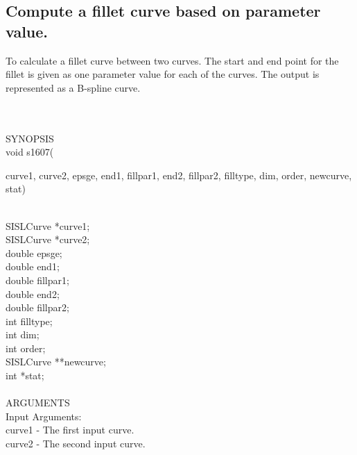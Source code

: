 \subsection{Compute a fillet curve based on parameter value.}
\begin{minipg1}
  To calculate a fillet curve between two curves. The start and end point
  for the fillet is given as one parameter value for each of the
  curves.
  The output is represented as a B-spline curve.
\end{minipg1} \\ \\
SYNOPSIS\\
        \>void s1607(\begin{minipg3}
        {\fov curve1}, {\fov curve2}, {\fov epsge}, {\fov end1}, {\fov fillpar1}, {\fov end2}, {\fov fillpar2},
        {\fov filltype}, {\fov dim}, {\fov order}, {\fov newcurve}, {\fov stat})
                \end{minipg3}\\[0.3ex]
                \>\>    SISLCurve       \>      *{\fov curve1};\\
                \>\>    SISLCurve       \>      *{\fov curve2};\\
                \>\>    double  \>      {\fov epsge};\\
                \>\>    double  \>      {\fov end1};\\
                \>\>    double  \>      {\fov fillpar1};\\
                \>\>    double  \>      {\fov end2};\\
                \>\>    double  \>      {\fov fillpar2};\\
                \>\>    int     \>      {\fov filltype};\\
                \>\>    int     \>      {\fov dim};\\
                \>\>    int     \>      {\fov order};\\
                \>\>    SISLCurve       \>      **{\fov newcurve};\\
                \>\>    int     \>      *{\fov stat};\\
\\
ARGUMENTS\\
        \>Input Arguments:\\
        \>\>    {\fov curve1}   \> - \> The first input curve.\\
        \>\>    {\fov curve2}   \> - \> The second input curve.\\
